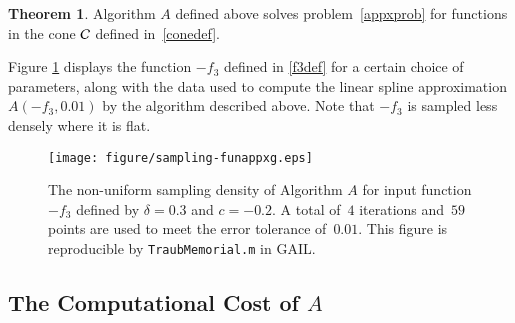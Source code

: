 \documentclass[review]{elsarticle}
\theoremstyle{definition}
\newtheorem{theorem}{Theorem}
\begin{document}
\begin{theorem} \label{thm:algAworks}
Algorithm $A$ defined above solves problem~\eqref{appxprob} for functions in the cone $\mathcal{C}$ defined in~\eqref{conedef}.
\end{theorem}

Figure \ref{fig:sampling-funappxg} displays the function $-f_3$ defined in \eqref{f3def} for a certain choice of parameters, along with the data used to compute the linear spline approximation $A(-f_3,0.01)$ by the algorithm described above.  Note that $-f_3$ is sampled less densely where it is flat.

\begin{figure}[tbh]
\centering
\texttt{[image: figure/sampling-funappxg.eps]}
\caption{The non-uniform sampling density of Algorithm $A$ for input function $-f_3$ defined by $\delta = 0.3$ and $c = -0.2$. A total of~$4$ iterations and~$59$ points are used to meet the error tolerance of~$0.01$. This figure is reproducible by
{\tt TraubMemorial.m} in GAIL.}
\label{fig:sampling-funappxg}
\end{figure}


\subsection{The Computational Cost of $A$} \label{subsec:appxcost}
\end{document}
